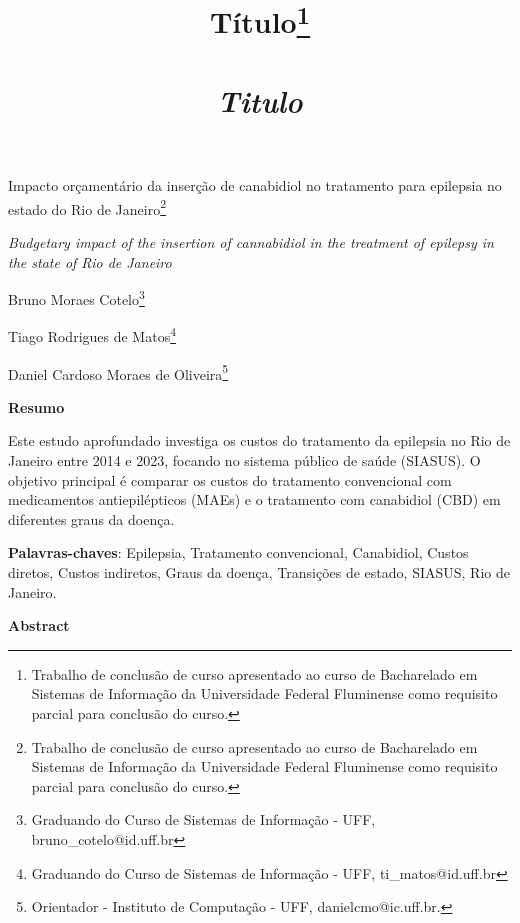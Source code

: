 \documentclass[article,a4paper,12pt,brazil,sumario=tradicional]{abntex2}
\title{ {\Large Título\footnote{Trabalho de conclusão de curso apresentado ao curso de Bacharelado em Sistemas de Informação da Universidade Federal Fluminense como requisito parcial para conclusão do curso.}\\\\
\vspace{.2} 
\textit{Titulo}\\}}
\date{ }
\begin{document}
\textual

\begin{center}
{\Large Impacto orçamentário da inserção de canabidiol no tratamento para epilepsia no estado do Rio de Janeiro\footnote{Trabalho de conclusão de curso apresentado ao curso de Bacharelado em Sistemas de Informação da Universidade Federal Fluminense como requisito parcial para conclusão do curso.}

\textit{Budgetary impact of the insertion of cannabidiol in the treatment of epilepsy in the state of Rio de Janeiro}\\}
\end{center}
\vspace{.2cm} 

\begin{flushright}
Bruno Moraes Cotelo\footnote{Graduando do Curso de Sistemas de Informação - UFF, bruno\_cotelo@id.uff.br}

Tiago Rodrigues de Matos\footnote{Graduando do Curso de Sistemas de Informação - UFF, ti\_matos@id.uff.br}

Daniel Cardoso Moraes de Oliveira\footnote{Orientador - Instituto de Computação - UFF, danielcmo@ic.uff.br.} 

\end{flushright}

\vspace{\onelineskip}

\begin{center}
    \textbf{Resumo}
\end{center}

\vspace{-.3cm}

\noindent Este estudo aprofundado investiga os custos do tratamento da epilepsia no Rio de Janeiro entre 2014 e 2023, focando no sistema público de saúde (SIASUS). O objetivo principal é comparar os custos do tratamento convencional com medicamentos antiepilépticos (MAEs) e o tratamento com canabidiol (CBD) em diferentes graus da doença.

\vspace{.4cm}
 
\noindent
\textbf{Palavras-chaves}: Epilepsia, Tratamento convencional, Canabidiol, Custos diretos, Custos indiretos, Graus da doença, Transições de estado, SIASUS, Rio de Janeiro.
 
\vspace{\onelineskip}

\begin{center}
    \textbf{Abstract}
\end{center}
\end{document}
